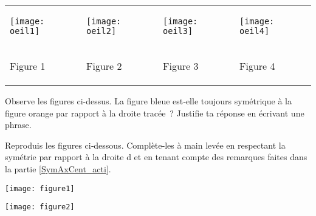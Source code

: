 \begin{activite}

\begin{center}
\begin{tabularx}{1.05\linewidth}{XXXX}
\begin{center} \texttt{[image: oeil1]} \end{center} & \begin{center} \texttt{[image: oeil2]} \end{center} & \begin{center} \texttt{[image: oeil3]} \end{center} & \begin{center} \texttt{[image: oeil4]} \end{center} \\
\begin{center} Figure 1 \end{center} & \begin{center} Figure 2 \end{center} & \begin{center} Figure 3 \end{center} & \begin{center} Figure 4 \end{center} \\
 \end{tabularx}
 \end{center}

\begin{partie} \label{SymAxCent_acti}
Observe les figures ci-dessus. La figure bleue est‑elle toujours symétrique à la figure orange par rapport à la droite tracée ? Justifie ta réponse en écrivant une phrase.
\end{partie}

\begin{partie}
Reproduis les figures ci‑dessous. Complète‑les à main levée en respectant la symétrie par rapport à la droite d et en tenant compte des remarques faites dans la partie \ref{SymAxCent_acti}.

\begin{minipage}[c]{0.48\linewidth}
\begin{center} \texttt{[image: figure1]} \end{center} 
 \end{minipage}
 \begin{minipage}[c]{0.48\linewidth}
 \begin{center} \texttt{[image: figure2]} \end{center} 
  \end{minipage} \\
\end{partie}

\end{activite}

